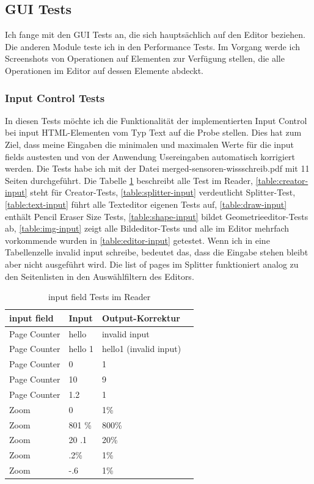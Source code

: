 \subsection{GUI Tests}
Ich fange mit den GUI Tests an, die sich hauptsächlich auf den Editor beziehen. Die anderen Module teste ich in den Performance Tests. Im Vorgang werde ich Screenshots von Operationen auf Elementen zur Verfügung stellen, die alle Operationen im Editor auf dessen Elemente abdeckt.

\subsubsection{Input Control Tests}
In diesen Tests möchte ich die Funktionalität der implementierten Input Control bei input HTML-Elementen vom Typ Text auf die Probe stellen. Dies hat zum Ziel, dass meine Eingaben die minimalen und maximalen Werte für die input fields austesten und von der Anwendung Usereingaben automatisch korrigiert werden. Die Tests habe ich mit der Datei merged-sensoren-wissschreib.pdf mit 11 Seiten durchgeführt. Die Tabelle \ref{table:reader-input} beschreibt alle Test im Reader, \ref{table:creator-input} steht für Creator-Tests, \ref{table:splitter-input} verdeutlicht Splitter-Test, \ref{table:text-input} führt alle Texteditor eigenen Tests auf, \ref{table:draw-input} enthält Pencil Eraser Size Tests, \ref{table:shape-input} bildet Geometrieeditor-Tests ab, \ref{table:img-input} zeigt alle Bildeditor-Tests und alle im Editor mehrfach vorkommende wurden in \ref{table:editor-input} getestet. Wenn ich in eine Tabellenzelle invalid input schreibe, bedeutet das, dass die Eingabe stehen bleibt aber nicht ausgeführt wird. Die list of pages im Splitter funktioniert analog zu den Seitenlisten in den Auswählfiltern des Editors.

\begin{table}[!htbp]
	\centering
	\begin{tabular}{|p{4cm}|p{3cm}|p{3cm}|p{3cm}|}
		\hline
		\textbf{input field}				& \textbf{Input} 	& \textbf{Output-Korrektur}	\\ 
		\hline
		Page Counter						& hello 			& invalid input				\\
		Page Counter						& hello 1			& hello1 (invalid input)	\\
		Page Counter						& 0 				& 1							\\ 
		Page Counter						& 10 				& 9 						\\ 
		Page Counter						& 1.2 				& 1 						\\ 
		Zoom 								& 0					& 1\%  						\\
		Zoom 								& 801 \% 			& 800\% 					\\ 
		Zoom 								& 20 .1 			& 20\% 						\\ 
		Zoom 								& .2\% 				& 1\% 					\\ 
		Zoom 								& -.6 				& 1\% 						\\ 
		\hline
	\end{tabular}
	\caption{input field Tests im Reader}
	\label{table:reader-input}
\end{table}	

